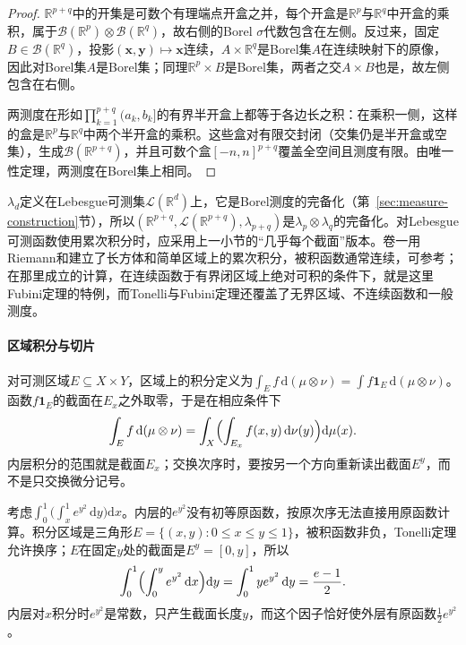 \begin{proof}
$\mathbb R^{p+q}$中的开集是可数个有理端点开盒之并，每个开盒是$\mathbb R^p$与$\mathbb R^q$中开盒的乘积，属于$\mathcal B(\mathbb R^p)\otimes\mathcal B(\mathbb R^q)$，故右侧的Borel $\sigma$代数包含在左侧。反过来，固定$B\in\mathcal B(\mathbb R^q)$，投影$(\bm x,\bm y)\mapsto\bm x$连续，$A\times\mathbb R^q$是Borel集$A$在连续映射下的原像，因此对Borel集$A$是Borel集；同理$\mathbb R^p\times B$是Borel集，两者之交$A\times B$也是，故左侧包含在右侧。

两测度在形如$\prod_{k=1}^{p+q}(a_k,b_k]$的有界半开盒上都等于各边长之积：在乘积一侧，这样的盒是$\mathbb R^p$与$\mathbb R^q$中两个半开盒的乘积。这些盒对有限交封闭（交集仍是半开盒或空集），生成$\mathcal B(\mathbb R^{p+q})$，并且可数个盒$[-n,n]^{p+q}$覆盖全空间且测度有限。由唯一性定理，两测度在Borel集上相同。
\end{proof}

$\lambda_d$定义在Lebesgue可测集$\mathcal L(\mathbb R^d)$上，它是Borel测度的完备化（第~\ref{sec:measure-construction}节），所以$(\mathbb R^{p+q},\mathcal L(\mathbb R^{p+q}),\lambda_{p+q})$是$\lambda_p\otimes\lambda_q$的完备化。对Lebesgue可测函数使用累次积分时，应采用上一小节的“几乎每个截面”版本。卷一用Riemann和建立了长方体和简单区域上的累次积分，被积函数通常连续，可参考；在那里成立的计算，在连续函数于有界闭区域上绝对可积的条件下，就是这里Fubini定理的特例，而Tonelli与Fubini定理还覆盖了无界区域、不连续函数和一般测度。

\paragraph{区域积分与切片}
对可测区域$E\subseteq X\times Y$，区域上的积分定义为$\int_Ef\,\mathrm d(\mu\otimes\nu)=\int f\mathbf 1_E\,\mathrm d(\mu\otimes\nu)$。函数$f\mathbf 1_E$的截面在$E_x$之外取零，于是在相应条件下
\[
 \int_Ef\,\mathrm d(\mu\otimes\nu)=\int_X\Bigl(\int_{E_x}f(x,y)\,\mathrm d\nu(y)\Bigr)\mathrm d\mu(x).
\]
内层积分的范围就是截面$E_x$；交换次序时，要按另一个方向重新读出截面$E^y$，而不是只交换微分记号。

\begin{example}
\label{ex:integral-order-swap}
考虑$\int_0^1\bigl(\int_x^1e^{y^2}\,\mathrm dy\bigr)\mathrm dx$。内层的$e^{y^2}$没有初等原函数，按原次序无法直接用原函数计算。积分区域是三角形$E=\{(x,y):0\le x\le y\le1\}$，被积函数非负，Tonelli定理允许换序；$E$在固定$y$处的截面是$E^y=[0,y]$，所以
\[
 \int_0^1\Bigl(\int_0^ye^{y^2}\,\mathrm dx\Bigr)\mathrm dy=\int_0^1ye^{y^2}\,\mathrm dy=\frac{e-1}2.
\]
内层对$x$积分时$e^{y^2}$是常数，只产生截面长度$y$，而这个因子恰好使外层有原函数$\frac12e^{y^2}$。
\end{example}

